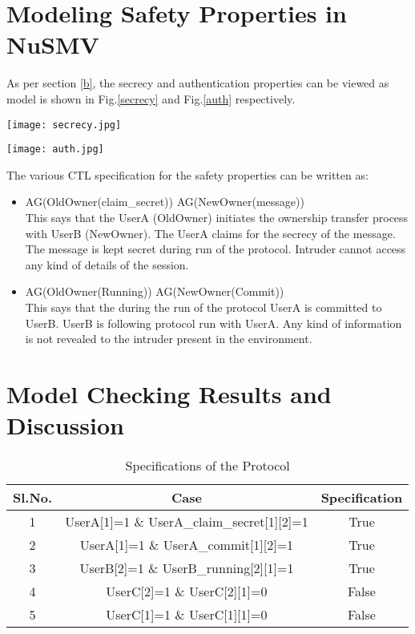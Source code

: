 \documentclass[letterpaper]{article}
\begin{document}
\section{Modeling Safety Properties in NuSMV}
\label{e}
As per section \ref{b}, the secrecy and authentication properties can be viewed as model is shown in Fig.\ref{secrecy} and Fig.\ref{auth} respectively.
\begin{figure*}[bpht!]
	\centering
		\texttt{[image: secrecy.jpg]}
	\caption{Model Showing a Secrecy Claim.}
	\label{secrecy}
\end{figure*}


\begin{figure*}[bpht!]
	\centering
		\texttt{[image: auth.jpg]}
	\caption{Model Showing an Authentication Claim.}
	\label{auth}
\end{figure*}


The various CTL specification for the safety properties can be written as:
\begin{itemize}
	\item AG(OldOwner(claim\_secret))  AG(NewOwner(message))\\
	This says that the UserA (OldOwner) initiates the ownership transfer process with UserB (NewOwner). The UserA claims for the secrecy of the message. The message is kept secret during run of the protocol. Intruder cannot access any kind of details of the session.\\
	\item AG(OldOwner(Running))  AG(NewOwner(Commit))\\
	This says that the during the run of the protocol UserA is committed to UserB. UserB is following protocol run with UserA. Any kind of information is not revealed to the intruder present in the environment.\\
	\end{itemize}
	
\section{Model Checking Results and Discussion}	
\label{f}

\begin{table}[bpht!]
\centering
\caption{Specifications of the Protocol}
	\label{tab:1}
		\begin{tabular}{|c|c|c|}
		\hline
			Sl.No. & Case & Specification\\
			\hline
			1 & UserA[1]=1 \& UserA\_claim\_secret[1][2]=1 & True\\
			\hline
			2 & UserA[1]=1 \& UserA\_commit[1][2]=1 & True\\
			\hline
			3 & UserB[2]=1 \& UserB\_running[2][1]=1 & True\\
			\hline
			4 & UserC[2]=1 \& UserC[2][1]=0 & False\\
			\hline
			5 & UserC[1]=1 \& UserC[1][1]=0 & False\\
			\hline
			\end{tabular}
	\end{table}
\end{document}
